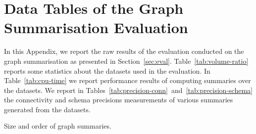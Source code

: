 \chapter{Data Tables of the Graph Summarisation Evaluation}

In this Appendix, we report the raw results of the evaluation conducted on the graph summarisation as presented in Section~\ref{sec:eval}. Table~\ref{tab:volume-ratio} reports some statistics about the datasets used in the evaluation. In Table~\ref{tab:cpu-time} we report performance results of computing summaries over the datasets. We report in Tables~\ref{tab:precision-conn}~and~\ref{tab:precision-schema} the connectivity and schema precisions measurements of various summaries generated from the datasets.

\begin{table}
	\centering
	\resizebox{\textwidth}{!}{
		
	}
	\caption{Size and order of graph summaries.}
	\label{tab:volume-ratio}
\end{table}

\begin{table}
	\centering
	\resizebox{\textwidth}{!}{
		
	}
	\caption[Computational performance of graph summaries creation]{Performance comparison. We report the CPU time in $ms$ of the \emph{edges} step in the graph summarisation computation. For each category of dataset complexity, we report the mean $\mu$ of the CPU time.%
	}
	\label{tab:cpu-time}
\end{table}





